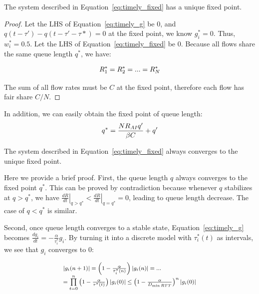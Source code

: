 \begin{thm}
The system described in Equation~\ref{eq:timely_fixed} has a unique fixed point.
\end{thm}
\begin{proof}
Let the LHS of Equation~\ref{eq:timely_g} be 0, and $q(t - \tau ') - q(t - \tau ' - \tau *) = 0$ at the fixed 
point, we know $g_i^*=0$. Thus, $w_i^*=0.5$. Let the LHS of Equation~\ref{eq:timely_fixed} be 0. Because
all flows share the same queue length $q^*$, we have:

\begin{equation}
\small
R_1^* = R_2^* = ... = R_N^*
\end{equation}

The sum of all flow rates must be $C$ at the fixed point, therefore each flow has fair share $C/N$. 
\end{proof}

In addition, we can easily obtain the fixed point of queue length:
\begin{equation}
\small
{q^*} = \frac{{N{R_{AI}}q'}}{{\beta C}} + q'
\label{eq:timely_fixed_q}
\end{equation}

\begin{thm}
The system described in Equation~\ref{eq:timely_fixed} always converges to the unique fixed point.
\end{thm}

Here we provide a brief proof. First, the queue length $q$ always
converges to the fixed point $q^*$. This can be proved by contradiction because whenever $q$ stabilizes
at $q>q^*$, we have ${\left. {\frac{{dR}}{{dt}}} \right|_{q > {q^*}}} < {\left. {\frac{{dR}}{{dt}}} \right|_{q = {q^*}}} = 0$, 
leading to queue length decrease. The case of $q<q^*$ is similar. 

Second, once queue length converges to a stable state, Equation~\ref{eq:timely_g} becomes
$\frac{{d{g_i}}}{{dt}} =  - \frac{\alpha }{{{\tau_i^*}}}{g_i}$. By turning it into a discrete model
with $\tau_i^*(t)$ as intervals, we see that $g_i$ converges to 0:

\begin{equation}
\small
\begin{array}{l}
\left| {{g_i}(n + 1)} \right| = \left( {1 - \frac{\alpha }{{\tau _i^*(n)}}} \right)\left| {{g_i}(n)} \right| = ...\\
 = \prod\limits_{t = 0}^n {\left( {1 - \frac{\alpha }{{{\tau ^*}(t)}}} \right)} \left| {{g_i}(0)} \right| \le {\left( {1 - \frac{\alpha }{{{D_{\min RTT}}}}} \right)^n}\left| {{g_i}(0)} \right|
\end{array}
\end{equation}


